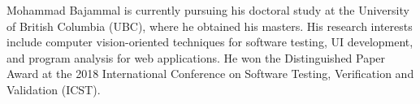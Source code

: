 \documentclass[10pt,journal,compsoc]{IEEEtran}
\begin{document}



%
%
%
%

% 

%
%
%

\begin{IEEEbiography}{Mohammad Bajammal}
  is currently pursuing his doctoral study at the University of British Columbia (UBC), where he obtained his masters.
  His research interests include computer vision-oriented techniques for software testing, UI development, and
  program analysis for web applications.
  He won the Distinguished Paper Award at the 2018 
  International Conference on Software Testing, Verification and Validation (ICST).
  \end{IEEEbiography}
\end{document}
